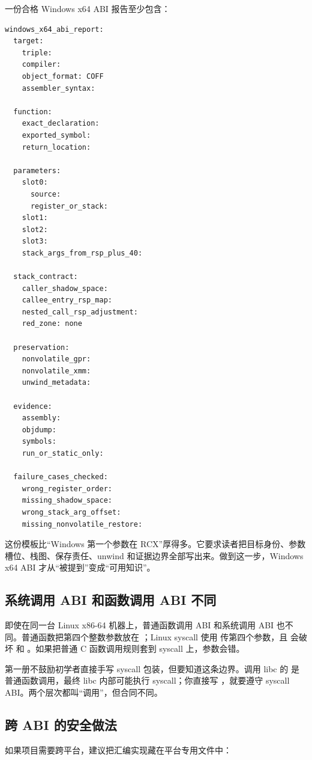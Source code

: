 一份合格 Windows x64 ABI 报告至少包含：

\begin{lstlisting}[numbers=none,caption={Windows x64 ABI report}]
windows_x64_abi_report:
  target:
    triple:
    compiler:
    object_format: COFF
    assembler_syntax:

  function:
    exact_declaration:
    exported_symbol:
    return_location:

  parameters:
    slot0:
      source:
      register_or_stack:
    slot1:
    slot2:
    slot3:
    stack_args_from_rsp_plus_40:

  stack_contract:
    caller_shadow_space:
    callee_entry_rsp_map:
    nested_call_rsp_adjustment:
    red_zone: none

  preservation:
    nonvolatile_gpr:
    nonvolatile_xmm:
    unwind_metadata:

  evidence:
    assembly:
    objdump:
    symbols:
    run_or_static_only:

  failure_cases_checked:
    wrong_register_order:
    missing_shadow_space:
    wrong_stack_arg_offset:
    missing_nonvolatile_restore:
\end{lstlisting}

这份模板比“Windows 第一个参数在 RCX”厚得多。它要求读者把目标身份、参数槽位、栈图、保存责任、unwind 和证据边界全部写出来。做到这一步，Windows x64 ABI 才从“被提到”变成“可用知识”。

\subsection{系统调用 ABI 和函数调用 ABI 不同}

即使在同一台 Linux x86-64 机器上，普通函数调用 ABI 和系统调用 ABI 也不同。普通函数把第四个整数参数放在 ；Linux syscall 使用  传第四个参数，且  会破坏  和 。如果把普通 C 函数调用规则套到 syscall 上，参数会错。

第一册不鼓励初学者直接手写 syscall 包装，但要知道这条边界。调用 libc 的  是普通函数调用，最终 libc 内部可能执行 syscall；你直接写 ，就要遵守 syscall ABI。两个层次都叫“调用”，但合同不同。

\subsection{跨 ABI 的安全做法}

如果项目需要跨平台，建议把汇编实现藏在平台专用文件中：

